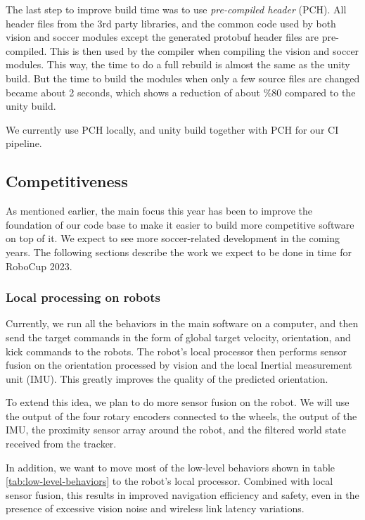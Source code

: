 \documentclass[runningheads]{llncs}
\begin{document}
The last step to improve build time was to use \textit{pre-compiled header} (PCH). All header files from the 3rd party libraries, and the common code used by both vision and soccer modules except the generated protobuf header files are pre-compiled. This is then used by the compiler when compiling the vision and soccer modules. This way, the time to do a full rebuild is almost the same as the unity build. But the time to build the modules when only a few source files are changed became about 2 seconds, which shows a reduction of about \%80 compared to the unity build.

We currently use PCH locally, and unity build together with PCH for our CI pipeline.

\subsection{Competitiveness}
As mentioned earlier, the main focus this year has been to improve the foundation of our code base to make it easier to build more competitive software on top of it. We expect to see more soccer-related development in the coming years. The following sections describe the work we expect to be done in time for RoboCup 2023.

\subsubsection{Local processing on robots}
Currently, we run all the behaviors in the main software on a computer, and then send the target commands in the form of global target velocity, orientation, and kick commands to the robots. The robot's local processor then performs sensor fusion on the orientation processed by vision and the local Inertial measurement unit (IMU). This greatly improves the quality of the predicted orientation.

To extend this idea, we plan to do more sensor fusion on the robot. We will use the output of the four rotary encoders connected to the wheels, the output of the IMU, the proximity sensor array around the robot, and the filtered world state received from the tracker.

In addition, we want to move most of the low-level behaviors shown in table \ref{tab:low-level-behaviors} to the robot's local processor. Combined with local sensor fusion, this results in improved navigation efficiency and safety, even in the presence of excessive vision noise and wireless link latency variations.
\end{document}
